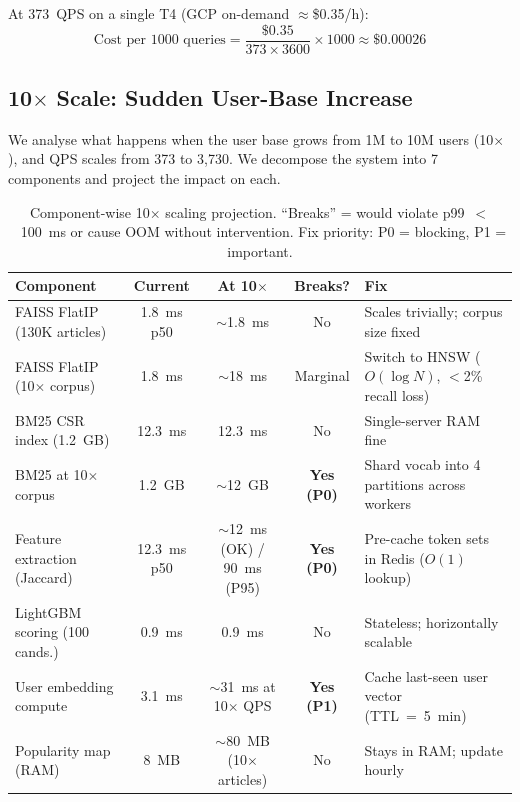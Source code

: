 \documentclass[11pt,a4paper]{article}
\begin{document}
At 373~QPS on a single T4 (GCP on-demand $\approx$\$0.35/h):
\[
\text{Cost per 1000 queries}
  = \frac{\$0.35}{373 \times 3600} \times 1000
  \approx \mathbf{\$0.00026}
\]

\subsection{10$\times$ Scale: Sudden User-Base Increase}

We analyse what happens when the user base grows from 1M to 10M users (10$\times$),
and QPS scales from 373 to 3,730. We decompose the system into 7 components and
project the impact on each.

\begin{table}[h]
\centering
\caption{Component-wise 10$\times$ scaling projection. ``Breaks'' = would violate p99~$<$~100~ms
or cause OOM without intervention. Fix priority: P0 = blocking, P1 = important.}
\label{tab:scale}
\begin{tabular}{p{3cm}cccp{4.5cm}}
\toprule
Component & Current & At 10$\times$ & Breaks? & Fix \\
\midrule
FAISS FlatIP (130K articles) & 1.8~ms p50 & $\sim$1.8~ms & No & Scales trivially; corpus size fixed \\
FAISS FlatIP (10$\times$ corpus) & 1.8~ms & $\sim$18~ms & Marginal & Switch to HNSW ($O(\log N)$, $<$2\% recall loss) \\
BM25 CSR index (1.2~GB) & 12.3~ms & 12.3~ms & No & Single-server RAM fine \\
BM25 at 10$\times$ corpus & 1.2~GB & $\sim$12~GB & \textbf{Yes (P0)} & Shard vocab into 4 partitions across workers \\
Feature extraction (Jaccard) & 12.3~ms p50 & $\sim$12~ms (OK) / 90~ms (P95) & \textbf{Yes (P0)} & Pre-cache token sets in Redis ($O(1)$ lookup) \\
LightGBM scoring (100 cands.) & 0.9~ms & 0.9~ms & No & Stateless; horizontally scalable \\
User embedding compute & 3.1~ms & $\sim$31~ms at 10$\times$ QPS & \textbf{Yes (P1)} & Cache last-seen user vector (TTL~=~5~min) \\
Popularity map (RAM) & 8~MB & $\sim$80~MB (10$\times$ articles) & No & Stays in RAM; update hourly \\
\bottomrule
\end{tabular}
\end{table}
\end{document}

